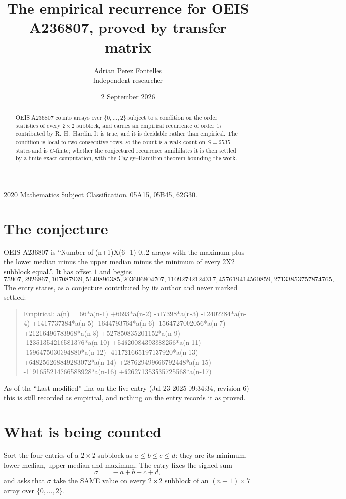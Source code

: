 \documentclass[11pt,a4paper]{article}
\title{The empirical recurrence for OEIS A236807, proved by transfer matrix}
\author{Adrian Perez Fontelles\\ \small Independent researcher}
\date{2 September 2026}
\theoremstyle{plain}
\theoremstyle{definition}
\begin{document}
\maketitle

\begin{abstract}
OEIS A236807 counts arrays over $\{0,\dots,2\}$ subject to a condition on the order
statistics of every $2\times2$ subblock, and carries an empirical recurrence of order
$17$ contributed by R.~H.~Hardin. It is true, and it is decidable rather than empirical.
The condition is local to two consecutive rows, so the count is a walk count on $S=5535$
states and is $C$-finite; whether the conjectured recurrence annihilates it is then settled by
a finite exact computation, with the Cayley--Hamilton theorem bounding the work.
\end{abstract}

\noindent\small 2020 Mathematics Subject Classification. 05A15, 05B45, 62G30.\normalsize

\section{The conjecture}

OEIS A236807 is ``Number of (n+1)X(6+1) 0..2 arrays with the maximum plus the lower median minus the upper median minus the minimum of every 2X2 subblock equal.''. It has offset $1$ and begins
\[
75907, 2926867, 107087939, 5140896385, 203606804707, 11092792124317, 457619414560859, 27133853757874765,\ \dots
\]
The entry states, as a conjecture contributed by its author and never marked settled:
\begin{quote}
Empirical: a(n) = 66*a(n-1) +6693*a(n-2) -517398*a(n-3) -12402284*a(n-4) +1417737384*a(n-5) -1644793764*a(n-6) -1564727002056*a(n-7) +21216496783968*a(n-8) +527850835201152*a(n-9) -12351354216581376*a(n-10) +54620084393888256*a(n-11) -1596475030394880*a(n-12) -411721665197137920*a(n-13) +648256268849283072*a(n-14) +287629499666792448*a(n-15) -1191655214366588928*a(n-16) +626271353535725568*a(n-17)
\end{quote}
As of the ``Last modified'' line on the live entry (Jul 23 2025 09:34:34, revision 6) this is still
recorded as empirical, and nothing on the entry records it as proved.

\section{What is being counted}

Sort the four entries of a $2\times2$ subblock as $a\le b\le c\le d$: they
are its minimum, lower median, upper median and maximum. The entry fixes the signed sum
\[
\sigma\;=\;-a+b-c+d,
\]
and asks that $\sigma$ take the SAME value on every $2\times2$ subblock of an
$(n+1)\times7$ array over $\{0,\dots,2\}$.
\end{document}
